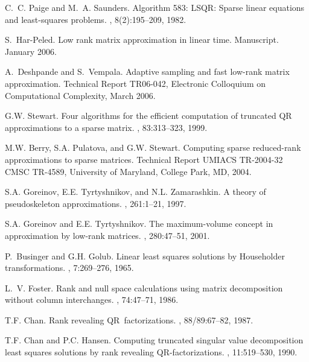 \documentclass[twoside]{article}
\begin{document}
\begin{small}
\begin{thebibliography}{100}
C.~C. Paige and M.~A. Saunders.
\newblock Algorithm 583: {LSQR}: Sparse linear equations and least-squares
  problems.
, 8(2):195--209, 1982.

S.~Har-Peled.
\newblock Low rank matrix approximation in linear time.
\newblock Manuscript. January 2006.

A.~Deshpande and S.~Vempala.
\newblock Adaptive sampling and fast low-rank matrix approximation.
\newblock Technical Report TR06-042, Electronic Colloquium on Computational
  Complexity, March 2006.

G.W. Stewart.
\newblock Four algorithms for the efficient computation of truncated {QR}
  approximations to a sparse matrix.
, 83:313--323, 1999.

M.W. Berry, S.A. Pulatova, and G.W. Stewart.
\newblock Computing sparse reduced-rank approximations to sparse matrices.
\newblock Technical Report UMIACS TR-2004-32 CMSC TR-4589, University of
  Maryland, College Park, MD, 2004.

S.A. Goreinov, E.E. Tyrtyshnikov, and N.L. Zamarashkin.
\newblock A theory of pseudoskeleton approximations.
, 261:1--21, 1997.

S.A. Goreinov and E.E. Tyrtyshnikov.
\newblock The maximum-volume concept in approximation by low-rank matrices.
, 280:47--51, 2001.

P.~Businger and G.H. Golub.
\newblock Linear least squares solutions by {H}ouseholder transformations.
, 7:269--276, 1965.

L.~V. Foster.
\newblock Rank and null space calculations using matrix decomposition without
  column interchanges.
, 74:47--71, 1986.

T.F. Chan.
\newblock Rank revealing {QR}~factorizations.
, 88/89:67--82, 1987.

T.F. Chan and P.C. Hansen.
\newblock Computing truncated singular value decomposition least squares
  solutions by rank revealing {QR}-factorizations.
,
  11:519--530, 1990.


\end{thebibliography}
\end{small}
\end{document}
